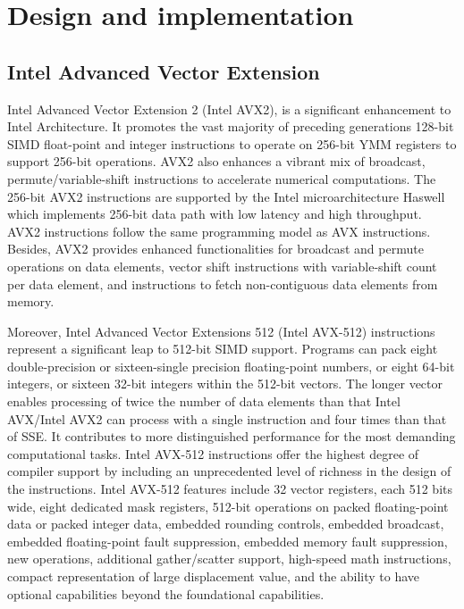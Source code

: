 \documentclass[sigconf]{acmart}
\begin{document}
\section{Design and implementation}\label{sec:design}
\subsection{Intel Advanced Vector Extension}
Intel Advanced Vector Extension 2 (Intel AVX2), is a significant enhancement to Intel Architecture.
It promotes the vast majority of preceding generations 128-bit SIMD float-point and integer instructions
to operate on 256-bit YMM registers to support 256-bit operations.
AVX2 also enhances a vibrant mix of broadcast, permute/variable-shift instructions to accelerate
numerical computations. The 256-bit AVX2 instructions are supported by the Intel microarchitecture
Haswell which implements 256-bit data path with low latency and high throughput.
AVX2 instructions follow the same programming model as AVX instructions.
Besides, AVX2 provides enhanced functionalities for broadcast and permute operations on data elements,
vector shift instructions with variable-shift count per data element,
and instructions to fetch non-contiguous data elements from memory.

Moreover, Intel Advanced Vector Extensions 512 (Intel AVX-512) instructions
represent a significant leap to 512-bit SIMD support.
Programs can pack eight double-precision or sixteen-single precision floating-point numbers,
or eight 64-bit integers, or sixteen 32-bit integers within the 512-bit vectors.
The longer vector enables processing of twice the number of data elements
than that Intel AVX/Intel AVX2 can
process with a single instruction and four times than that of SSE.
It contributes to more distinguished performance for the most demanding computational tasks.
Intel AVX-512 instructions offer the highest degree of compiler support by including an
unprecedented level of richness in the design of the instructions.
Intel AVX-512 features include 32 vector registers, each 512 bits wide, eight dedicated mask registers,
512-bit operations on packed floating-point data or packed integer data, embedded rounding controls,
embedded broadcast, embedded floating-point fault suppression, embedded memory fault suppression, new operations,
additional gather/scatter support, high-speed math instructions, compact representation of
large displacement value, and the ability to have optional capabilities beyond the foundational
capabilities.
\end{document}
